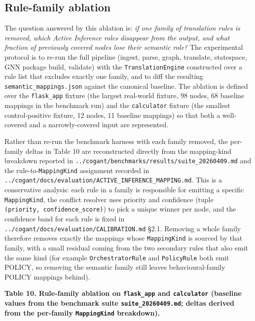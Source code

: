 \documentclass[
]{article}
\begin{document}
\subsection{Rule-family ablation}\label{rule-family-ablation}

The question answered by this ablation is: \emph{if one family of
translation rules is removed, which Active Inference roles disappear
from the output, and what fraction of previously covered nodes lose
their semantic role?} The experimental protocol is to re-run the full
pipeline (ingest, parse, graph, translate, statespace, GNN package
build, validate) with the \texttt{TranslationEngine} constructed over a
rule list that excludes exactly one family, and to diff the resulting
\texttt{semantic\_mappings.json} against the canonical baseline. The
ablation is defined over the \texttt{flask\_app} fixture (the largest
real-world fixture, 98 nodes, 68 baseline mappings in the benchmark run)
and the \texttt{calculator} fixture (the smallest control-positive
fixture, 12 nodes, 11 baseline mappings) so that both a well-covered and
a narrowly-covered input are represented.

Rather than re-run the benchmark harness with each family removed, the
per-family deltas in Table 10 are reconstructed directly from the
mapping-kind breakdown reported in
\texttt{../cogant/benchmarks/results/suite\_20260409.md} and the
rule-to-\texttt{MappingKind} assignment recorded in
\texttt{../cogant/docs/evaluation/ACTIVE\_INFERENCE\_MAPPING.md}. This
is a conservative analysis: each rule in a family is responsible for
emitting a specific \texttt{MappingKind}, the conflict resolver uses
priority and confidence (tuple \texttt{(priority,\ confidence\_score)})
to pick a unique winner per node, and the confidence band for each rule
is fixed in \texttt{../cogant/docs/evaluation/CALIBRATION.md} §2.1.
Removing a whole family therefore removes exactly the mappings whose
\texttt{MappingKind} is sourced by that family, with a small residual
coming from the two secondary rules that also emit the same kind (for
example \texttt{OrchestratorRule} and \texttt{PolicyRule} both emit
POLICY, so removing the semantic family still leaves behavioural-family
POLICY mappings behind).

\textbf{Table 10. Rule-family ablation on \texttt{flask\_app} and
\texttt{calculator} (baseline values from the benchmark suite
\texttt{suite\_20260409.md}; deltas derived from the per-family
\texttt{MappingKind} breakdown).}
\end{document}
